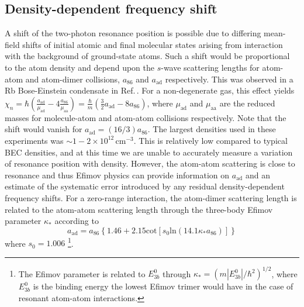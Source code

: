 \subsection{Density-dependent frequency shift}
A shift of the two-photon resonance position is possible due to differing mean-field shifts of initial atomic and final molecular states arising from interaction with the background of ground-state atoms.
Such a shift would be proportional to the atom density and depend upon the $s$-wave scattering lengths for atom-atom and atom-dimer collisions, $a_{86}$ and $a_{\text{ad}}$ respectively.
This was observed in a Rb Bose-Einstein condensate in Ref.\,\cite{wfh00}. 
For a non-degenerate gas, this effect yields $\chi_n=\hbar (\frac{a_{\text{ad}}}{\mu_{\text{ad}}}-4\frac{a_{86}}{\mu_{\text{aa}}})=\frac{\hbar}{m} (\frac{3 }{2}a_{\text{ad}}-8 a_{86})$, where $\mu_{\text{ad}}$ and $\mu_{\text{aa}}$ are the reduced masses for molecule-atom and atom-atom collisions respectively.
Note that the shift would vanish for $a_{\text{ad}}=(16/3) a_{86}$.
The largest densities used in these experiments was $\sim 1-2\times 10^{12}\,\mathrm{cm}^{-3}$.
This is relatively low compared to typical BEC densities, and at this time we are unable to accurately measure a variation of resonance position with density.
However, the atom-atom scattering is close to resonance and thus Efimov physics can provide information on $a_{\text{ad}}$ \cite{bha07,nen17} and an estimate of the systematic error introduced by any residual density-dependent frequency shifts.
For a zero-range interaction, the atom-dimer scattering length is related to the atom-atom scattering length through the three-body Efimov parameter $\kappa_*$ according to \cite{bha07}
\begin{equation}\label{Eq:EfimovMoleculAtomScatteringLength}
  a_{\text{ad}}=a_{86}\left\{1.46 + 2.15 \mathrm{cot}[s_0 \mathrm{ln} (14.1\kappa_* a_{86}) ]\right\}
\end{equation}
where $s_0=1.006$ \footnote{The Efimov parameter is related to $E^0_{3b}$ through $\kappa_*=(m|E^0_{3b}|/\hbar^2)^{1/2}$, where $E^0_{3b}$ is the binding energy the lowest Efimov trimer would have in the case of resonant atom-atom interactions.}.

